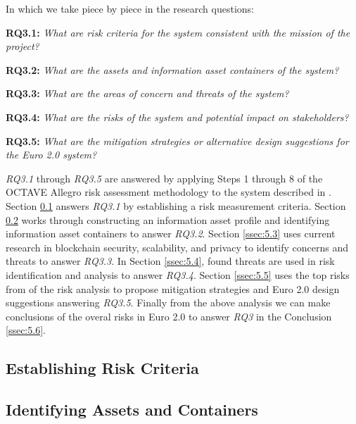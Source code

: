 \documentclass[12pt]{article} %
\newcommand{\hypernameref}[1]{\hyperref[#1]{\nameref{#1}}}
\begin{document}
{In which we take piece by piece in the research questions:
\begin{quoting}
	\textbf{RQ3.1: }\textit{What are risk criteria for the system consistent with the mission of the project?}
\end{quoting}
\begin{quoting}
	\textbf{RQ3.2: }\textit{What are the assets and information asset containers of the system?}
\end{quoting}
\begin{quoting}
	\textbf{RQ3.3: }\textit{What are the areas of concern and threats of the system?}
\end{quoting}
\begin{quoting}
	\textbf{RQ3.4: }\textit{What are the risks of the system and potential impact on stakeholders?}
\end{quoting}
\begin{quoting}
	\textbf{RQ3.5: }\textit{What are the mitigation strategies or alternative design suggestions for the Euro 2.0 system?}
\end{quoting}

\textit{RQ3.1} through \textit{RQ3.5} are answered by applying Steps 1 through 8 of the OCTAVE Allegro risk assessment methodology\cite{CaralliIntroducingOCTAVE2007} to the system described in \hypernameref{sec:3}. Section \ref{ssec:5.1} answers \textit{RQ3.1} by establishing a risk measurement criteria. Section \ref{ssec:5.2} works through constructing an information asset profile and identifying information asset containers to answer \textit{RQ3.2}. Section \ref{ssec:5.3} uses current research in blockchain security, scalability, and privacy to identify concerns and threats to answer \textit{RQ3.3}. In Section \ref{ssec:5.4}, found threats are used in risk identification and analysis to answer \textit{RQ3.4}. Section \ref{ssec:5.5} uses the top risks from of the risk analysis to propose mitigation strategies and Euro 2.0 design suggestions answering \textit{RQ3.5}. Finally from the above analysis we can make conclusions of the overal risks in Euro 2.0 to answer \textit{RQ3} in the Conclusion \ref{ssec:5.6}.

\subsection{Establishing Risk Criteria} \label{ssec:5.1}

\subsection{Identifying Assets and Containers} \label{ssec:5.2}

}
\end{document}

